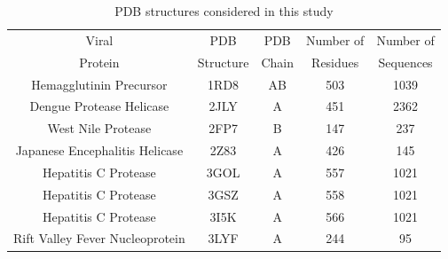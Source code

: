\documentclass[12pt]{article}
\begin{document}
\begin{table}[htbp]
        \begin{center}
                \caption{PDB structures considered in this study \label{tab:pdb_names}}
                \begin{tabular}{c c c c c} %
                        \hline
                        \hline
                        Viral                                           & PDB            & PDB       & Number of          & Number of   \\ %
                        Protein                                                 & Structure      & Chain     & Residues           & Sequences   \\ %
                        \hline                                                                                          
                        Hemagglutinin Precursor         & 1RD8           & AB        & 503                & 1039        \\ %
                        Dengue Protease Helicase        & 2JLY           & A         & 451                & 2362        \\ %
                        West Nile Protease              & 2FP7           & B         & 147                & 237         \\ %
                        Japanese Encephalitis Helicase  & 2Z83           & A         & 426                & 145         \\ %
                        Hepatitis C Protease            & 3GOL           & A         & 557                & 1021        \\ %
                        Hepatitis C Protease            & 3GSZ           & A         & 558                & 1021        \\ %
                        Hepatitis C Protease            & 3I5K           & A         & 566                & 1021        \\ %
                        Rift Valley Fever Nucleoprotein & 3LYF           & A         & 244                & 95          \\ %

\end{tabular}
\end{center}
\end{table}
\end{document}
